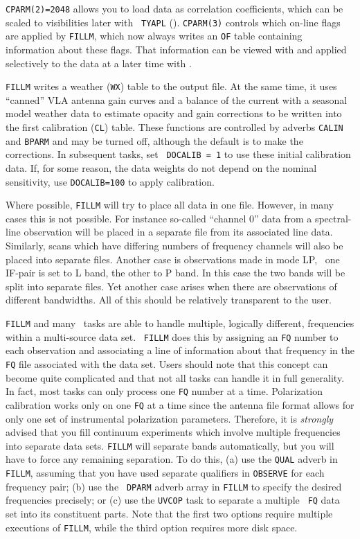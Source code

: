       {\tt CPARM(2)=2048} allows you to load data as correlation
coefficients, which can be scaled to visibilities later with {\tt
TYAPL} ().  {\tt CPARM(3)} controls which on-line flags are
applied by {\tt FILLM}, which now always writes an {\tt OF} table
containing information about these flags.  That information can be
viewed with {\tt {}} and applied selectively to the data at
a later time with {\tt {}}\@.

      {\tt FILLM} writes a weather ({\tt WX}) table to the output
file.  At the same time, it uses ``canned'' VLA antenna gain curves
and a balance of the current with a seasonal model weather data to
estimate opacity and gain corrections to be written into the first
calibration ({\tt CL}) table.  These functions are controlled by
adverbs {\tt CALIN} and {\tt BPARM} and may be turned off, although
the default is to make the corrections. In subsequent tasks, set {\tt
DOCALIB = 1} to use these initial calibration data.  If, for some
reason, the data weights do not depend on the nominal sensitivity, use
{\tt DOCALIB=100} to apply calibration.

     Where possible, {\tt FILLM} will try to place all data in one
file.  However, in many cases this is not possible.  For instance
so-called ``channel 0'' data from a spectral-line observation will be
placed in a separate file from its associated line data.  Similarly,
scans which have differing numbers of frequency channels will also be
placed into separate files.  Another case is observations made in mode
LP, \ie\ one IF-pair is set to L band, the other to P band. In this
case the two bands will be split into separate files.  Yet another
case arises when there are observations of different bandwidths. All
of this should be relatively transparent to the user.

     {\tt FILLM} and many \AIPS\ tasks are able to handle multiple,
logically different, frequencies within a multi-source data set.  {\tt
FILLM} does this by assigning an {\tt FQ} number to each observation
 and associating a line of information about that
frequency in the {\tt FQ} file associated with the data set.  Users
should note that this concept can become quite complicated and that
not all tasks can handle it in full generality.  In fact, most tasks
can only process one {\tt FQ} number at a time.  Polarization
calibration works only on one {\tt FQ} at a time since the antenna
file format allows for only one set of instrumental polarization
parameters.  Therefore, it is {\it strongly\/} advised that you fill
continuum experiments which involve multiple frequencies into separate
data sets.  {\tt FILLM} will separate bands automatically, but you
will have to force any remaining separation.  To do this, (a) use the
{\tt QUAL} adverb in {\tt FILLM}, assuming that you have used separate
qualifiers in {\tt OBSERVE} for each frequency pair; (b) use the {\tt
DPARM} adverb array in {\tt FILLM} to specify the desired frequencies
precisely; or (c) use the {\tt UVCOP} task to separate a multiple {\tt
FQ} data set into its constituent parts.  Note that the first two
options require multiple executions of {\tt FILLM}, while the third
option requires more disk space.

